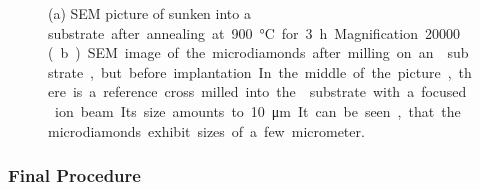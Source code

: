 	\begin{figure}[htp]
		\begin{subfigure}[t]{ 0.49\linewidth}
			\centering
			\caption{}\label{subfig::sunken_nd}
		\end{subfigure}
		\hfill
		\begin{subfigure}[t]{ 0.49\linewidth}
			\centering
			\caption{}\label{subfig::microdiamonds}
		\end{subfigure}
		\caption{(a) SEM picture of \nds sunken into a \si substrate after annealing at \SI{900}{\celsius} for \SI{3}{h}. Magnification \num{20000}. (b) SEM image of the microdiamonds after milling on an \ir substrate, but before implantation. In the middle of the picture, there is a reference cross milled into the \ir substrate with a focused ion beam. Its size amounts to \SI{10}{\micro\meter}. It can be seen, that the microdiamonds exhibit sizes of a few micrometer.}
		\label{fig::<fig>}
	\end{figure}


	\subsubsection{Final Procedure}\label{subsubsec::final_procedure}

